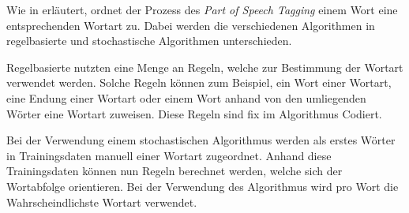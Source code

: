 

Wie in \cite{manning1999foundations,brill1992simple,brill1994some} erläutert, ordnet der Prozess des \textit{Part of Speech Tagging} einem Wort eine entsprechenden Wortart zu. Dabei werden die verschiedenen Algorithmen in regelbasierte und stochastische Algorithmen unterschieden. 

Regelbasierte nutzten eine Menge an Regeln, welche zur Bestimmung der Wortart verwendet werden. Solche Regeln können zum Beispiel, ein Wort einer Wortart, eine Endung einer Wortart oder einem Wort anhand von den umliegenden Wörter eine Wortart zuweisen. Diese Regeln sind fix im Algorithmus Codiert. 

Bei der Verwendung einem stochastischen Algorithmus werden als erstes Wörter in Trainingsdaten manuell einer Wortart zugeordnet. Anhand diese Trainingsdaten können nun Regeln berechnet werden, welche sich der Wortabfolge orientieren. Bei der Verwendung des Algorithmus wird pro Wort die Wahrscheindlichste Wortart verwendet.










\section{}

